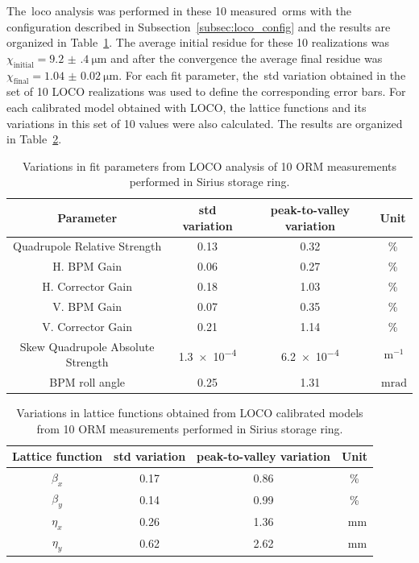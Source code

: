 The~\gls{loco} analysis was performed in these 10 measured~\glspl{orm} with the configuration described in Subsection~\ref{subsec:loco_config} and the results are organized in Table~\ref{tab:fit_var}. The average initial residue for these 10 realizations was $\chi_{\mathrm{initial}} = \SI{9.2(4)}{\micro\meter}$ and after the convergence the average final residue was $\chi_{\mathrm{final}} = \SI{1.04(2)}{\micro\meter}$. For each fit parameter, the~\gls{std} variation obtained in the set of 10 LOCO realizations was used to define the corresponding error bars. For each calibrated model obtained with LOCO, the lattice functions and its variations in this set of 10 values were also calculated. The results are organized in Table~\ref{tab:twiss_var}. 
\begin{table}
    \centering
    \caption{Variations in fit parameters from LOCO analysis of 10 ORM measurements performed in Sirius storage ring.}
    \label{tab:fit_var}
    \begin{tabular}{cccc}
        \toprule\toprule
        Parameter & std variation & peak-to-valley variation & Unit \\
        \hline
        Quadrupole Relative Strength     & 0.13 & 0.32 & \% \\  
        H. BPM Gain             & 0.06 & 0.27 & \%\\
        H. Corrector Gain       & 0.18 & 1.03 & \%\\
        V. BPM  Gain             & 0.07 & 0.35 & \%\\
        V. Corrector Gain       & 0.21 & 1.14 & \%\\
        Skew Quadrupole Absolute Strength& \num{1.3e-4} & \num{6.2e-4} & $\SI{}{\meter^{-1}}$\\
        BPM roll angle                & 0.25 & 1.31 & $\SI{}{\milli\radian}$ \\
        \bottomrule\bottomrule
    \end{tabular}
\end{table}
\begin{table}
    \centering
    \caption{Variations in lattice functions obtained from LOCO calibrated models from 10 ORM measurements performed in Sirius storage ring.}
    \label{tab:twiss_var}
    \begin{tabular}{cccc}
        \toprule\toprule
        Lattice function & std variation & peak-to-valley variation & Unit \\
        \hline
        $\beta_x$ & \num{0.17}& \num{0.86} & \%\\
        $\beta_y$ & \num{0.14} & \num{0.99}& \% \\
        $\eta_x$ & \num{0.26} & \num{1.36} & \SI{}{\milli\meter}\\
        $\eta_y$ & \num{0.62} & \num{2.62} & \SI{}{\milli\meter} \\
        \bottomrule\bottomrule
    \end{tabular}
\end{table}

